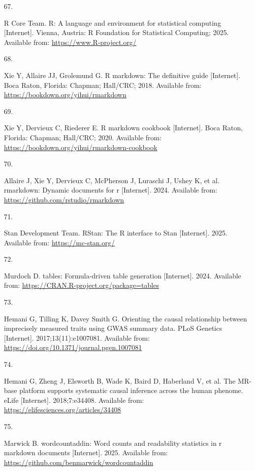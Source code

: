 \documentclass[
]{article}
\newlength{\cslhangindent}
\newlength{\csllabelwidth}
\newenvironment{CSLReferences}[2] %
 {\begin{list}{}{%
  \setlength{\itemindent}{0pt}
  \setlength{\leftmargin}{0pt}
  \setlength{\parsep}{0pt}
  \ifodd #1
   \setlength{\leftmargin}{\cslhangindent}
   \setlength{\itemindent}{-1\cslhangindent}
  \fi
  \setlength{\itemsep}{#2\baselineskip}}}
 {\end{list}}
\newcommand{\CSLLeftMargin}[1]{\parbox[t]{\csllabelwidth}{\strut#1\strut}}
\newcommand{\CSLRightInline}[1]{\parbox[t]{\linewidth - \csllabelwidth}{\strut#1\strut}}
\begin{document}
\begin{CSLReferences}{0}{1}
\CSLLeftMargin{67. }%
\CSLRightInline{R Core Team. {R}: A language and environment for statistical computing {[}Internet{]}. Vienna, Austria: R Foundation for Statistical Computing; 2025. Available from: \url{https://www.R-project.org/}}

\CSLLeftMargin{68. }%
\CSLRightInline{Xie Y, Allaire JJ, Grolemund G. R markdown: The definitive guide {[}Internet{]}. Boca Raton, Florida: Chapman; Hall/CRC; 2018. Available from: \url{https://bookdown.org/yihui/rmarkdown}}

\CSLLeftMargin{69. }%
\CSLRightInline{Xie Y, Dervieux C, Riederer E. R markdown cookbook {[}Internet{]}. Boca Raton, Florida: Chapman; Hall/CRC; 2020. Available from: \url{https://bookdown.org/yihui/rmarkdown-cookbook}}

\CSLLeftMargin{70. }%
\CSLRightInline{Allaire J, Xie Y, Dervieux C, McPherson J, Luraschi J, Ushey K, et al. {rmarkdown}: Dynamic documents for r {[}Internet{]}. 2024. Available from: \url{https://github.com/rstudio/rmarkdown}}

\CSLLeftMargin{71. }%
\CSLRightInline{Stan Development Team. {RStan}: The {R} interface to {Stan} {[}Internet{]}. 2025. Available from: \url{https://mc-stan.org/}}

\CSLLeftMargin{72. }%
\CSLRightInline{Murdoch D. {tables}: Formula-driven table generation {[}Internet{]}. 2024. Available from: \url{https://CRAN.R-project.org/package=tables}}

\CSLLeftMargin{73. }%
\CSLRightInline{Hemani G, Tilling K, Davey Smith G. Orienting the causal relationship between imprecisely measured traits using GWAS summary data. PLoS Genetics {[}Internet{]}. 2017;13(11):e1007081. Available from: \url{https://doi.org/10.1371/journal.pgen.1007081}}

\CSLLeftMargin{74. }%
\CSLRightInline{Hemani G, Zheng J, Elsworth B, Wade K, Baird D, Haberland V, et al. The MR-base platform supports systematic causal inference across the human phenome. eLife {[}Internet{]}. 2018;7:e34408. Available from: \url{https://elifesciences.org/articles/34408}}

\CSLLeftMargin{75. }%
\CSLRightInline{Marwick B. {wordcountaddin}: Word counts and readability statistics in r markdown documents {[}Internet{]}. 2025. Available from: \url{https://github.com/benmarwick/wordcountaddin}}

\end{CSLReferences}
\end{document}
